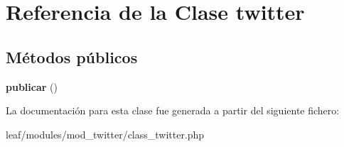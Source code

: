 \hypertarget{classtwitter}{\section{Referencia de la Clase twitter}
\label{classtwitter}
}
\subsection*{Métodos públicos}
\begin{DoxyCompactItemize}
\item 
\hypertarget{classtwitter_a03152964b365754fcf7e76902762da37}{{\bfseries publicar} ()}\label{classtwitter_a03152964b365754fcf7e76902762da37}

\end{DoxyCompactItemize}


La documentación para esta clase fue generada a partir del siguiente fichero\-:\begin{DoxyCompactItemize}
\item 
leaf/modules/mod\-\_\-twitter/class\-\_\-twitter.\-php\end{DoxyCompactItemize}
